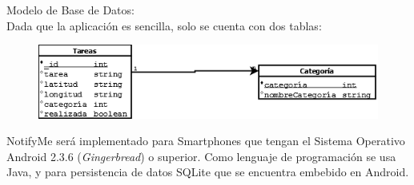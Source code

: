 \documentclass[a4paper,11pt]{article}
\begin{document}
Modelo de Base de Datos: \\

Dada que la aplicación es sencilla, solo se cuenta con dos tablas: \\

\begin{figure}[h]
\centering
\includegraphics[width=0.7\linewidth]{./DB}
\caption{}
\label{fig 1: Modelo ER de Base de Datos de NotifyMe}
\end{figure}

NotifyMe será implementado para Smartphones que tengan el Sistema Operativo Android 2.3.6 (\emph{Gingerbread}) o superior. Como lenguaje de programación se usa Java, y para persistencia de datos SQLite que se encuentra embebido en Android.
\end{document}
